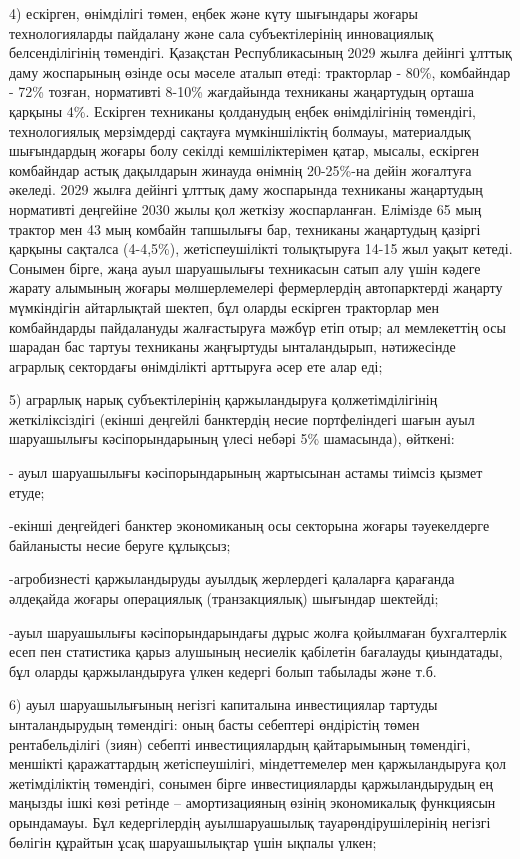 {{4) ескірген, өнімділігі төмен, еңбек және күту шығындары жоғары
технологияларды пайдалану және сала субъектілерінің инновациялық
белсенділігінің төмендігі. Қазақстан Республикасының 2029 жылға дейінгі
ұлттық даму жоспарының өзінде осы мәселе аталып өтеді: тракторлар -
80\%, комбайндар - 72\% тозған, нормативті 8-10\% жағдайында техниканы
жаңартудың орташа қарқыны 4\%. Ескірген техниканы қолданудың еңбек
өнімділігінің төмендігі, технологиялық мерзімдерді сақтауға
мүмкіншіліктің болмауы, материалдық шығындардың жоғары болу секілді
кемшіліктерімен қатар, мысалы, ескірген комбайндар астық дақылдарын
жинауда өнімнің 20-25\%-на дейін жоғалтуға әкеледі. 2029 жылға дейінгі
ұлттық даму жоспарында техниканы жаңартудың нормативті деңгейіне 2030
жылы қол жеткізу жоспарланған. Елімізде 65 мың трактор мен 43 мың
комбайн тапшылығы бар, техниканы жаңартудың қазіргі қарқыны сақталса
(4-4,5\%), жетіспеушілікті толықтыруға 14-15 жыл уақыт кетеді. Сонымен
бірге, жаңа ауыл шаруашылығы техникасын сатып алу үшін кәдеге жарату
алымының жоғары мөлшерлемелері фермерлердің автопарктерді жаңарту
мүмкіндігін айтарлықтай шектеп, бұл оларды ескірген тракторлар мен
комбайндарды пайдалануды жалғастыруға мәжбүр етіп отыр; ал мемлекеттің
осы шарадан бас тартуы техниканы жаңғыртуды ынталандырып, нәтижесінде
аграрлық сектордағы өнімділікті арттыруға әсер ете алар еді;

5) аграрлық нарық субъектілерінің қаржыландыруға қолжетімділігінің
жеткіліксіздігі (екінші деңгейлі банктердің несие портфеліндегі шағын
ауыл шаруашылығы кәсіпорындарының үлесі небәрі 5\% шамасында), өйткені:

- ауыл шаруашылығы кәсіпорындарының жартысынан астамы тиімсіз қызмет
етуде;

-екінші деңгейдегі банктер экономиканың осы секторына жоғары
тәуекелдерге байланысты несие беруге құлықсыз;

-агробизнесті қаржыландыруды ауылдық жерлердегі қалаларға қарағанда
әлдеқайда жоғары операциялық (транзакциялық) шығындар шектейді;

-ауыл шаруашылығы кәсіпорындарындағы дұрыс жолға қойылмаған бухгалтерлік
есеп пен статистика қарыз алушының несиелік қабілетін бағалауды
қиындатады, бұл оларды қаржыландыруға үлкен кедергі болып табылады және
т.б.

6) ауыл шаруашылығының негізгі капиталына инвестициялар тартуды
ынталандырудың төмендігі: оның басты себептері өндірістің төмен
рентабельділігі (зиян) себепті инвестициялардың қайтарымының төмендігі,
меншікті қаражаттардың жетіспеушілігі, міндеттемелер мен қаржыландыруға
қол жетімділіктің төмендігі, сонымен бірге инвестицияларды
қаржыландырудың ең маңызды ішкі көзі ретінде -- амортизацияның өзінің
экономикалық функциясын орындамауы. Бұл кедергілердің ауылшаруашылық
тауарөндірушілерінің негізгі бөлігін құрайтын ұсақ шаруашылықтар үшін
ықпалы үлкен;

}}
